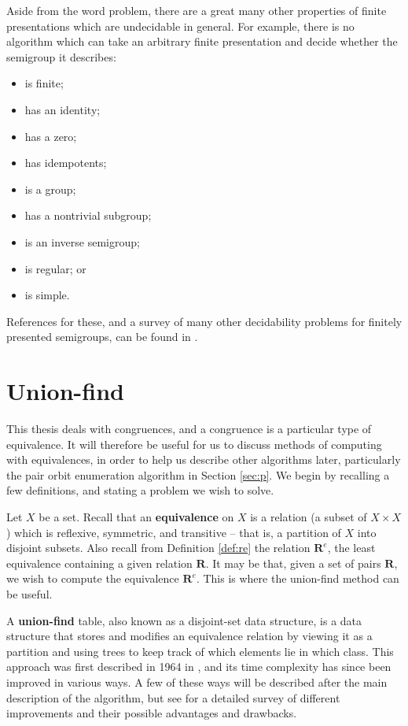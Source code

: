 Aside from the word problem, there are a great many other properties of finite
presentations which are undecidable in general.  For example, there is no
algorithm which can take an arbitrary finite presentation and decide whether the
semigroup it describes:
\begin{itemize}
\item is finite;
\item has an identity;
\item has a zero;
\item has idempotents;
\item is a group;
\item has a nontrivial subgroup;
\item is an inverse semigroup;
\item is regular; or
\item is simple.
\end{itemize}
References for these, and a survey of many other decidability problems for
finitely presented semigroups, can be found in \cite{cain_maltcev}.

\section{Union-find}
\label{sec:union-find}
This thesis deals with congruences, and a congruence is a particular type of
equivalence.  It will therefore be useful for us to discuss methods of computing
with equivalences, in order to help us describe other algorithms later,
particularly the pair orbit enumeration algorithm in Section \ref{sec:p}.  We
begin by recalling a few definitions, and stating a problem we wish to solve.

Let $X$ be a set.  Recall that an \textbf{equivalence} on $X$ is a relation (a
subset of $X \times X$) which is reflexive, symmetric, and transitive -- that is,
a partition of $X$ into disjoint subsets.  Also recall from Definition
\ref{def:re} the relation $\mathbf{R}^e$, the least equivalence containing a
given relation $\mathbf{R}$.  It may be that, given a set of pairs $\mathbf{R}$,
we wish to compute the equivalence $\mathbf{R}^e$.  This is where the union-find
method can be useful.

A \textbf{union-find} table, also known as a disjoint-set data structure, is a
data structure that stores and modifies an equivalence relation by viewing it as
a partition and using trees to keep track of which elements lie in which class.
This approach was first described in 1964 in \cite{galler_1964}, and its time
complexity has since been improved in various ways.  A few of these ways will be
described after the main description of the algorithm, but see \cite{galil_1991}
for a detailed survey of different improvements and their possible advantages
and drawbacks.

